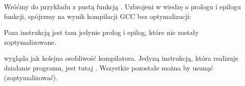 
Wróćmy do przykładu z pustą funkcją .
Uzbrojeni w wiedzę o prologu i epilogu funkcji, spójrzmy na wynik kompilacji GCC bez optymalizacji:



Poza instrukcją  jest tam jedynie prolog i epilog, które nie zostały zoptymalizowane.

 wygląda jak kolejna osobliwość kompilatora.
Jedyną instrukcją, która realizuje działanie programu, jest tutaj .
Wszystkie pozostałe można by usunąć (zoptymalizować).

